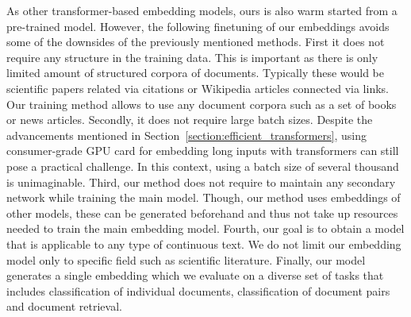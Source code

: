 As other transformer-based embedding models, ours is also warm started from a
pre-trained model. However, the following finetuning of our embeddings
avoids some of the downsides of the previously mentioned methods. First it does
not require any structure in the training data. This is important as there is
only limited amount of structured corpora of documents. Typically these would
be scientific papers related via citations or Wikipedia articles connected via
links. Our training method allows to use any document corpora such as a set of
books or news articles. Secondly, it does not require large batch sizes.
Despite the advancements mentioned in
Section~\ref{section:efficient_transformers}, using consumer-grade GPU card for
embedding long inputs with transformers can still pose a practical challenge.
In this context, using a batch size of several thousand is unimaginable. Third,
our method does not require to maintain any secondary network while training
the main model. Though, our method uses embeddings of other models, these can
be generated beforehand and thus not take up resources needed to train the main
embedding model. Fourth, our goal is to obtain a model that is applicable to
any type of continuous text. We do not limit our embedding model only to
specific field such as scientific literature. Finally, our model generates a
single embedding which we evaluate on a diverse set of tasks that includes
classification of individual documents, classification of document pairs and
document retrieval.
